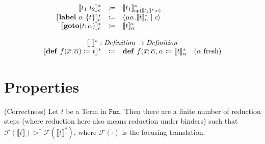 \documentclass[nonacm]{acmart}
\newcommand{\translate}[1]{\ensuremath{\llbracket #1 \rrbracket}}
\newcommand{\cut}[2]{\ensuremath{\langle #1 \mid #2 \rangle}}
\newcommand{\goto}[2]{\ensuremath{\mathbf{goto}(#1; #2)}}
\newcommand{\lab}[2]{\ensuremath{\mathbf{label}\ #1\ \{#2 \}}}
\newcommand{\defi}[2]{\ensuremath{\mathbf{def}\ #1 \coloneq #2}}
\newcommand{\translatestar}[2]{\ensuremath{\llbracket #1 \rrbracket_{#2}^{\ast}}}
\newcommand{\reducesto}{\ensuremath{\triangleright}}
\newcommand{\focus}[1]{\ensuremath{\mathcal{F}(#1)}}
\newcommand{\fresh}[1]{\ensuremath{(#1\text{ fresh})}}
\begin{document}
\[\begin{array}{rcll}
    \translatestar{t_1\ t_2}{c} & \coloneq & \translatestar{t_1}{\mathtt{ap}(\translatestar{t_2}{}; c)} & \\
    \translatestar{\lab{\alpha}{t}}{c} & \coloneq & \cut{\mu \alpha.\translatestar{t}{\alpha}}{c} & \\
    \translatestar{\goto{t}{\alpha}}{c} & \coloneq & \translatestar{t}{\alpha} & \\
    \\
    \multicolumn{4}{c}{\translatestar{\cdot}{} : \emph{Definition} \rightarrow \emph{Definition}}\\
    \translatestar{\defi{f(\overline{x}; \overline{\alpha})}{t}}{} & \coloneq & \defi{f(\overline{x}; \overline{\alpha}, \alpha}{\translatestar{t}{\alpha}} & \fresh{\alpha}
  \end{array}
\]

\section{Properties}
\label{sec:Properties}

\begin{theorem} (Correctness)
  Let $t$ be a Term in $\mathtt{Fun}$. Then there are a finite number of reduction steps (where reduction here also means reduction under binders) such that $\focus{\translate{t}} \reducesto^{\ast} \focus{\translatestar{t}{}}$, where $\focus{\cdot}$ is the focusing translation.
\end{theorem}
\end{document}
